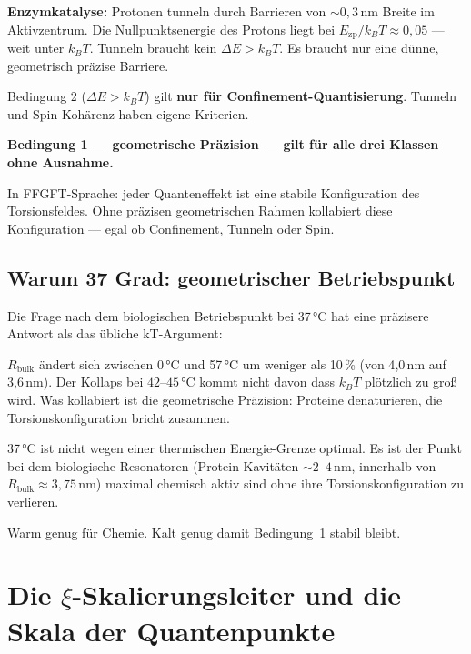 \textbf{Enzymkatalyse:}
Protonen tunneln durch Barrieren von $\sim 0{,}3$\,nm Breite
im Aktivzentrum. Die Nullpunktsenergie des Protons liegt bei
$E_\text{zp}/k_BT \approx 0{,}05$ --- weit unter $k_BT$.
Tunneln braucht kein $\Delta E > k_BT$. Es braucht nur
eine dünne, geometrisch präzise Barriere.

\begin{foundation}
Bedingung 2 ($\Delta E > k_BT$) gilt \textbf{nur für Confinement-Quantisierung}.
Tunneln und Spin-Kohärenz haben eigene Kriterien.

\textbf{Bedingung 1 --- geometrische Präzision --- gilt für alle drei Klassen
ohne Ausnahme.}

In FFGFT-Sprache: jeder Quanteneffekt ist eine stabile Konfiguration
des Torsionsfeldes. Ohne präzisen geometrischen Rahmen kollabiert
diese Konfiguration --- egal ob Confinement, Tunneln oder Spin.
\end{foundation}

\subsection{Warum 37 Grad: geometrischer Betriebspunkt}

Die Frage nach dem biologischen Betriebspunkt bei 37\,°C
hat eine präzisere Antwort als das übliche kT-Argument:

$R_{\text{bulk}}$ ändert sich zwischen 0\,°C und 57\,°C
um weniger als 10\,\% (von 4{,}0\,nm auf 3{,}6\,nm).
Der Kollaps bei $42$--$45\,°\text{C}$ kommt nicht davon
dass $k_BT$ plötzlich zu groß wird. Was kollabiert ist
die geometrische Präzision: Proteine denaturieren,
die Torsionskonfiguration bricht zusammen.

\begin{foundation}
37\,°C ist nicht wegen einer thermischen Energie-Grenze optimal.
Es ist der Punkt bei dem biologische Resonatoren
(Protein-Kavitäten $\sim 2$--$4$\,nm, innerhalb von
$R_{\text{bulk}} \approx 3{,}75$\,nm) maximal
chemisch aktiv sind ohne ihre Torsionskonfiguration zu verlieren.

Warm genug für Chemie.
Kalt genug damit Bedingung~1 stabil bleibt.
\end{foundation}

\section{Die \texorpdfstring{$\xi$}{xi}-Skalierungsleiter und
  die Skala der Quantenpunkte}
\label{sec:xi-leiter}

